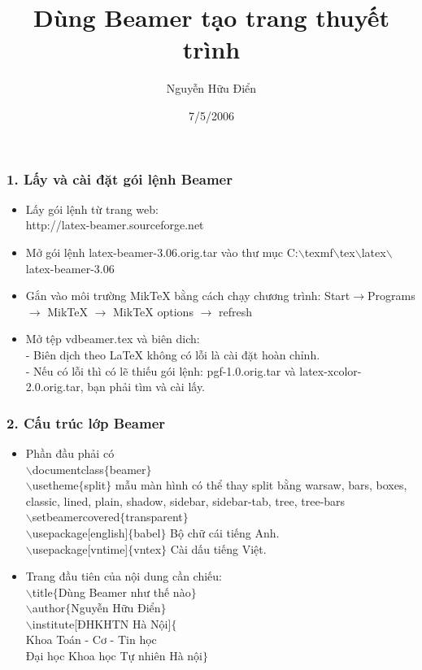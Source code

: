 \documentclass[10pt]{beamer}
\title{Dùng Beamer tạo trang thuyết trình}
\author{Nguyễn Hữu Điển}
\institute[ĐHKHTN Hà Nội]{
  Khoa Toán - Cơ - Tin học\\
  Đại học Khoa học Tự nhiên Hà nội}
\date{7/5/2006}
\begin{document}
\frame{\maketitle}

\begin{frame}
  \frametitle{1. Lấy và cài đặt gói lệnh Beamer}
  \begin{itemize}
  \item\textcolor[rgb]{1.0,0.0,0.50}{ Lấy gói lệnh từ trang web:\\
  http://latex-beamer.sourceforge.net}
    \pause
  \item\textcolor[rgb]{1.0,0.0,0.50}{ Mở gói lệnh latex-beamer-3.06.orig.tar vào thư mục
   C:$\backslash$texmf$\backslash$tex$\backslash$latex$\backslash$latex-beamer-3.06}
  \pause
  \item Gắn vào môi trường MikTeX bằng cách chạy chương trình:
 Start$\rightarrow$Programs $\rightarrow$ MikTeX $\rightarrow$ MikTeX options $\rightarrow$ refresh
\pause
  \item Mở tệp vdbeamer.tex và biên dich:\\
 - Biên dịch theo LaTeX không có lỗi là cài đặt hoàn chỉnh.\\
 - Nếu có lỗi thì có lẽ thiếu gói lệnh: pgf-1.0.orig.tar và latex-xcolor-2.0.orig.tar, bạn phải tìm và cài lấy.
  \end{itemize}
\end{frame}

\begin{frame}  
\frametitle{2. Cấu trúc lớp Beamer}
  \pause
  \begin{itemize}
  \item Phần đầu phải có\\
$\backslash$documentclass$\{$beamer$\}$\\
$\backslash$usetheme$\{$split$\}$ mẫu màn hình có thể thay split bằng warsaw, bars, boxes, classic, lined, plain, shadow, sidebar, sidebar-tab, tree, tree-bars\\
$\backslash$setbeamercovered$\{$transparent$\}$\\
$\backslash$usepackage[english]$\{$babel$\}$ Bộ chữ cái tiếng Anh.\\
$\backslash$usepackage[vntime]$\{$vntex$\}$ Cài dấu tiếng Việt.
 \pause
 \item Trang đầu tiên của nội dung cần chiếu:\\
 $\backslash$title$\{$Dùng Beamer như thế nào$\}$\\
$\backslash$author$\{$Nguyễn Hữu Điển$\}$\\
$\backslash$institute[ĐHKHTN Hà Nội]$\{$\\
  Khoa Toán - Cơ - Tin học\\
  Đại học Khoa học Tự nhiên Hà nội$\}$
  \end{itemize}
\end{frame}
\end{document}
